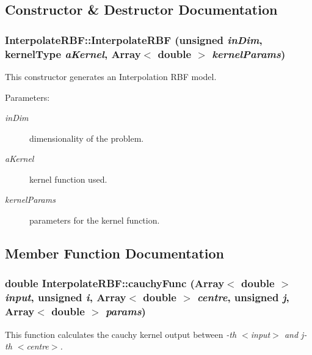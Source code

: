 \subsection{Constructor \& Destructor Documentation}
\subsubsection{\setlength{\rightskip}{0pt plus 5cm}Interpolate\-RBF::Interpolate\-RBF (unsigned {\em in\-Dim}, kernel\-Type {\em a\-Kernel}, Array$<$ double $>$ {\em kernel\-Params})}\label{classInterpolateRBF_a1}


This constructor generates an Interpolation RBF model. 

\begin{Desc}
\item[Parameters:]
\begin{description}
\item[{\em in\-Dim}]dimensionality of the problem. \item[{\em a\-Kernel}]kernel function used. \item[{\em kernel\-Params}]parameters for the kernel function.\end{description}
\end{Desc}


\subsection{Member Function Documentation}
\subsubsection{\setlength{\rightskip}{0pt plus 5cm}double Interpolate\-RBF::cauchy\-Func (Array$<$ double $>$ {\em input}, unsigned {\em i}, Array$<$ double $>$ {\em centre}, unsigned {\em j}, Array$<$ double $>$ {\em params})\hspace{0.3cm}{\tt  [static]}}\label{classInterpolateRBF_e6}


This function calculates the cauchy kernel output between {\em -th $<$input$>$ and j-th $<$centre$>$. \/}

